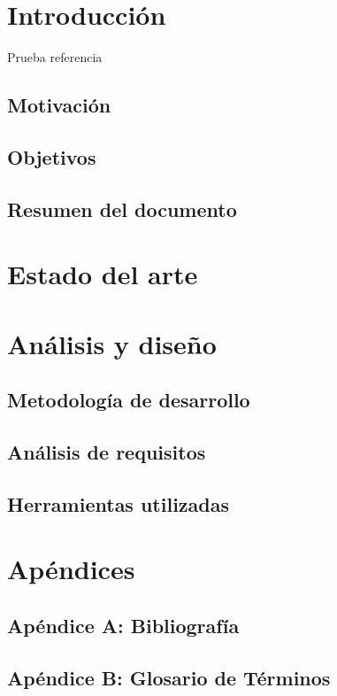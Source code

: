 \documentclass[14pt]{extarticle}
\theoremstyle{definition}
\theoremstyle{remark}
\begin{document}
\section{Introducción}\label{sec:introduccion}
Prueba referencia \citep{wiki:test}
\subsection{Motivación}\label{sec:motivacion}
\subsection{Objetivos}\label{sec:objetivos}
\subsection{Resumen del documento}\label{sec:resumen}
\section{Estado del arte}\label{sec:estadodelarte}
\section{Análisis y diseño}\label{sec:analisisydiseno}
\subsection{Metodología de desarrollo}\label{sec:metodologiadedesarrollo}
\subsection{Análisis de requisitos}\label{sec:analisisderequisitos}
\subsection{Herramientas utilizadas}
\section{Apéndices}\label{sec:apendices}
\subsection{Apéndice A: Bibliografía}\label{sec:bibliografia}


\newpage
\subsection{Apéndice B: Glosario de Términos}\label{sec:glosariodeterminos}
\end{document}
